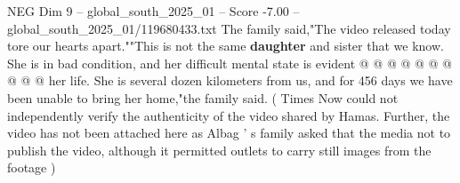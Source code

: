 \begin{textsample}{NEG Dim 9 – global\_south\_2025\_01 – Score -7.00 – global\_south\_2025\_01/119680433.txt}
The family said,"The video released today tore our hearts apart.""This is not the same \textbf{daughter} and sister that we know.
She is in bad condition, and her difficult mental state is evident @ @ @ @ @ @ @ @ @ @ her life.
She is several dozen kilometers from us, and for 456 days we have been unable to bring her home,"the family said. ( Times Now could not independently verify the authenticity of the video shared by Hamas.
Further, the video has not been attached here as Albag ' s family asked that the media not to publish the video, although it permitted outlets to carry still images from the footage )

\end{textsample}
